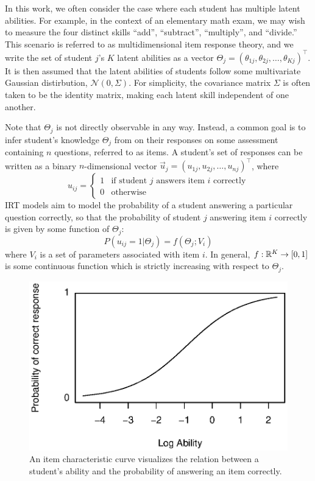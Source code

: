 In this work, we often consider the case where each student has multiple latent abilities. For example, in the context of an elementary math exam, we may wish to measure the four distinct skills ``add'', ``subtract'', ``multiply'', and ``divide.'' This scenario is referred to as multidimensional item response theory, and we write the set of student $j$'s $K$ latent abilities as a vector $\Theta_j = (\theta_{1j}, \theta_{2j}, \ldots, \theta_{Kj})^\top$. It is then assumed that the latent abilities of students follow some multivariate Gaussian distirbution, $\mathcal{N}(0, \Sigma)$. For simplicity, the covariance matrix $\Sigma$ is often taken to be the identity matrix, making each latent skill independent of one another.

Note that $\Theta_j$ is not directly observable in any way. Instead, a common goal is to infer student's knowledge $\Theta_j$ from on their responses on some assessment containing $n$ questions, referred to as items. A student's set of responses can be written as a binary $n$-dimensional vector $\vec u_j = (u_{1j}, u_{2j}, \ldots, u_{nj})^\top$, where 
\begin{equation}
  u_{ij} = \begin{cases} 1 & \text{if student } j \text{ answers item } i \text{ correctly} \\0 & \text{otherwise} \end{cases} 
  \label{eq:responses}
\end{equation}
IRT models aim to model the probability of a student answering a particular question correctly, so that the probability of student $j$ answering item $i$ correctly is given by some function of $\Theta_j$:
\begin{equation}
  P(u_{ij} = 1 | \Theta_j) = f(\Theta_j; V_i)
\end{equation}
where $V_i$ is a set of parameters associated with item $i$. In general, $f:\mathbb{R}^K \to [0,1]$ is some continuous function which is strictly increasing with respect to $\Theta_j$.

\begin{figure}[h]
  \centering
  \includegraphics[width=.6\textwidth, angle=90]{img/logistic_1param_icc.eps}
  \caption{An item characteristic curve visualizes the relation between a student's ability and the probability of answering an item correctly.}
  \label{fig:icc}
\end{figure}

